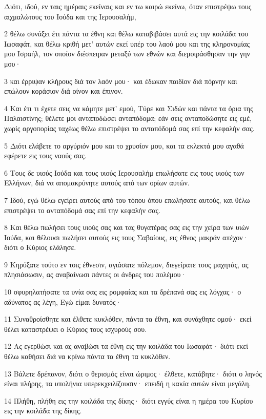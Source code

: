 \par Διότι, ιδού, εν ταις ημέραις εκείναις και εν τω καιρώ εκείνω, όταν επιστρέψω τους αιχμαλώτους του Ιούδα και της Ιερουσαλήμ,
\par 2 θέλω συνάξει έτι πάντα τα έθνη και θέλω καταβιβάσει αυτά εις την κοιλάδα του Ιωσαφάτ, και θέλω κριθή μετ' αυτών εκεί υπέρ του λαού μου και της κληρονομίας μου Ισραήλ, τον οποίον διέσπειραν μεταξύ των εθνών και διεμοιράσθησαν την γην μου·
\par 3 και έρριψαν κλήρους διά τον λαόν μου· και έδωκαν παιδίον διά πόρνην και επώλουν κοράσιον διά οίνον και έπινον.
\par 4 Και έτι τι έχετε σεις να κάμητε μετ' εμού, Τύρε και Σιδών και πάντα τα όρια της Παλαιστίνης; θέλετε μοι ανταποδώσει ανταπόδομα; εάν σεις ανταποδώσητε εις εμέ, χωρίς αργοπορίας ταχέως θέλω επιστρέψει το ανταπόδομά σας επί την κεφαλήν σας.
\par 5 Διότι ελάβετε το αργύριόν μου και το χρυσίον μου, και τα εκλεκτά μου αγαθά εφέρετε εις τους ναούς σας.
\par 6 Τους δε υιούς Ιούδα και τους υιούς Ιερουσαλήμ επωλήσατε εις τους υιούς των Ελλήνων, διά να απομακρύνητε αυτούς από των ορίων αυτών.
\par 7 Ιδού, εγώ θέλω εγείρει αυτούς από του τόπου όπου επωλήσατε αυτούς, και θέλω επιστρέψει το ανταπόδομά σας επί την κεφαλήν σας.
\par 8 Και θέλω πωλήσει τους υιούς σας και τας θυγατέρας σας εις την χείρα των υιών Ιούδα, και θέλουσι πωλήσει αυτούς εις τους Σαβαίους, εις έθνος μακράν απέχον· διότι ο Κύριος ελάλησε.
\par 9 Κηρύξατε τούτο εν τοις έθνεσιν, αγιάσατε πόλεμον, διεγείρατε τους μαχητάς, ας πλησιάσωσιν, ας αναβαίνωσι πάντες οι άνδρες του πολέμου·
\par 10 σφυρηλατήσατε τα υνία σας εις ρομφαίας και τα δρέπανά σας εις λόγχας· ο αδύνατος ας λέγη, Εγώ είμαι δυνατός·
\par 11 Συναθροίσθητε και έλθετε κυκλόθεν, πάντα τα έθνη, και συνάχθητε ομού· εκεί θέλει καταστρέψει ο Κύριος τους ισχυρούς σου.
\par 12 Ας εγερθώσι και ας αναβώσι τα έθνη εις την κοιλάδα του Ιωσαφάτ· διότι εκεί θέλω καθήσει διά να κρίνω πάντα τα έθνη τα κυκλόθεν.
\par 13 Βάλετε δρέπανον, διότι ο θερισμός είναι ώριμος· έλθετε, κατάβητε· διότι ο ληνός είναι πλήρης, τα υπολήνια υπερεκχειλίζουσιν· επειδή η κακία αυτών είναι μεγάλη.
\par 14 Πλήθη, πλήθη εις την κοιλάδα της δίκης· διότι εγγύς είναι η ημέρα του Κυρίου εις την κοιλάδα της δίκης.
